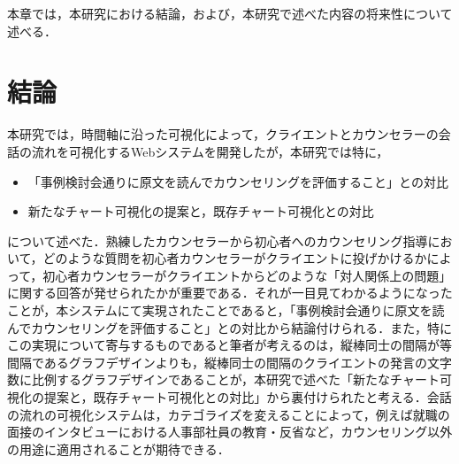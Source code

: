 \documentclass[shuuron]{kuee}
\begin{document}
本章では，本研究における結論，および，本研究で述べた内容の将来性について述べる．

\section{結論}

本研究では，時間軸に沿った可視化によって，クライエントとカウンセラーの会話の流れを可視化するWebシステムを開発したが，本研究では特に，
\begin{itemize}
  \item 「事例検討会通りに原文を読んでカウンセリングを評価すること」との対比
  \item 新たなチャート可視化の提案と，既存チャート可視化との対比
\end{itemize}
について述べた．熟練したカウンセラーから初心者へのカウンセリング指導において，どのような質問を初心者カウンセラーがクライエントに投げかけるかによって，初心者カウンセラーがクライエントからどのような「対人関係上の問題」に関する回答が発せられたかが重要である．それが一目見てわかるようになったことが，本システムにて実現されたことであると，「事例検討会通りに原文を読んでカウンセリングを評価すること」との対比から結論付けられる．また，特にこの実現について寄与するものであると筆者が考えるのは，縦棒同士の間隔が等間隔であるグラフデザインよりも，縦棒同士の間隔のクライエントの発言の文字数に比例するグラフデザインであることが，本研究で述べた「新たなチャート可視化の提案と，既存チャート可視化との対比」から裏付けられたと考える．会話の流れの可視化システムは，カテゴライズを変えることによって，例えば就職の面接のインタビューにおける人事部社員の教育・反省など，カウンセリング以外の用途に適用されることが期待できる．




\end{document}
